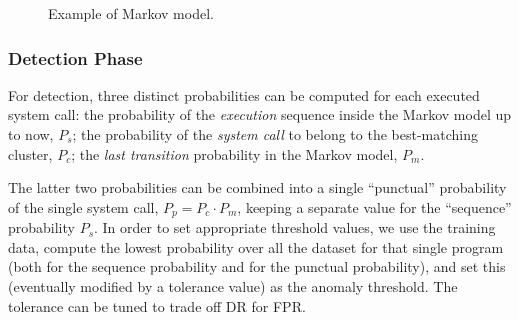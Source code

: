 \begin{figure}[t]
  \centering
  \caption{Example of Markov model.}
  \label{fig:markov}
\end{figure}

\subsubsection{Detection Phase}
For detection, three distinct probabilities can be computed for each executed system call: the probability of the \emph{execution} sequence inside the Markov model up to now, $P_s$; the probability of the \emph{system call} to belong to the best-matching cluster, $P_c$; the \emph{last transition} probability in the Markov model, $P_m$.

The latter two probabilities can be combined into a single ``punctual'' probability of the single system call, $P_p = P_c \cdot P_m$, keeping a separate value for the ``sequence'' probability $P_s$. In order to set appropriate threshold values, we use the training data, compute the lowest probability over all the dataset for that single program (both for the sequence probability and for the punctual probability), and set this (eventually modified by a tolerance value) as the anomaly threshold. The tolerance can be tuned to trade off \ac{DR} for \ac{FPR}.

